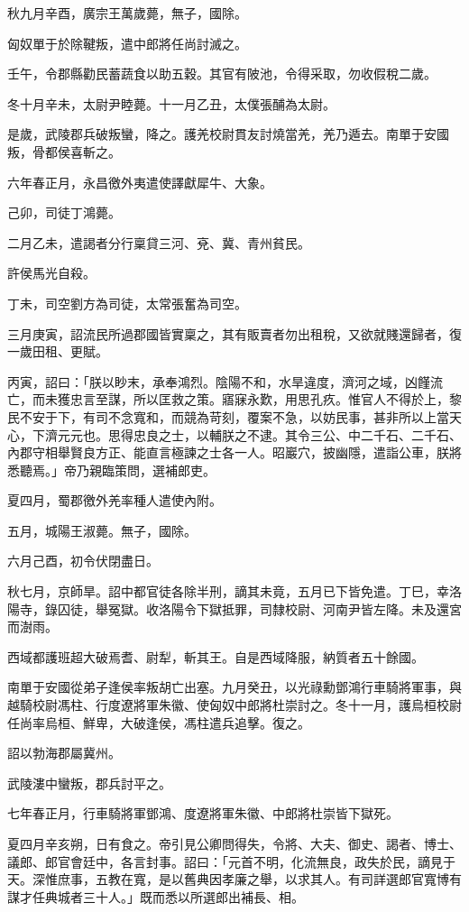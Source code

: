 \begin{pinyinscope}
秋九月辛酉，廣宗王萬歲薨，無子，國除。

匈奴單于於除鞬叛，遣中郎將任尚討滅之。

壬午，令郡縣勸民蓄蔬食以助五穀。其官有陂池，令得采取，勿收假稅二歲。

冬十月辛未，太尉尹睦薨。十一月乙丑，太僕張酺為太尉。

是歲，武陵郡兵破叛蠻，降之。護羌校尉貫友討燒當羌，羌乃遁去。南單于安國叛，骨都侯喜斬之。

六年春正月，永昌徼外夷遣使譯獻犀牛、大象。

己卯，司徒丁鴻薨。

二月乙未，遣謁者分行稟貸三河、兗、冀、青州貧民。

許侯馬光自殺。

丁未，司空劉方為司徒，太常張奮為司空。

三月庚寅，詔流民所過郡國皆實稟之，其有販賣者勿出租稅，又欲就賤還歸者，復一歲田租、更賦。

丙寅，詔曰：「朕以眇末，承奉鴻烈。陰陽不和，水旱違度，濟河之域，凶饉流亡，而未獲忠言至謀，所以匡救之策。寤寐永歎，用思孔疚。惟官人不得於上，黎民不安于下，有司不念寬和，而競為苛刻，覆案不急，以妨民事，甚非所以上當天心，下濟元元也。思得忠良之士，以輔朕之不逮。其令三公、中二千石、二千石、內郡守相舉賢良方正、能直言極諫之士各一人。昭巖穴，披幽隱，遣詣公車，朕將悉聽焉。」帝乃親臨策問，選補郎吏。

夏四月，蜀郡徼外羌率種人遣使內附。

五月，城陽王淑薨。無子，國除。

六月己酉，初令伏閉盡日。

秋七月，京師旱。詔中都官徒各除半刑，謫其未竟，五月已下皆免遣。丁巳，幸洛陽寺，錄囚徒，舉冤獄。收洛陽令下獄抵罪，司隸校尉、河南尹皆左降。未及還宮而澍雨。

西域都護班超大破焉耆、尉犁，斬其王。自是西域降服，納質者五十餘國。

南單于安國從弟子逢侯率叛胡亡出塞。九月癸丑，以光祿勳鄧鴻行車騎將軍事，與越騎校尉馮柱、行度遼將軍朱徽、使匈奴中郎將杜崇討之。冬十一月，護烏桓校尉任尚率烏桓、鮮卑，大破逢侯，馮柱遣兵追擊。復之。

詔以勃海郡屬冀州。

武陵漊中蠻叛，郡兵討平之。

七年春正月，行車騎將軍鄧鴻、度遼將軍朱徽、中郎將杜崇皆下獄死。

夏四月辛亥朔，日有食之。帝引見公卿問得失，令將、大夫、御史、謁者、博士、議郎、郎官會廷中，各言封事。詔曰：「元首不明，化流無良，政失於民，謫見于天。深惟庶事，五教在寬，是以舊典因孝廉之舉，以求其人。有司詳選郎官寬博有謀才任典城者三十人。」既而悉以所選郎出補長、相。


\end{pinyinscope}

